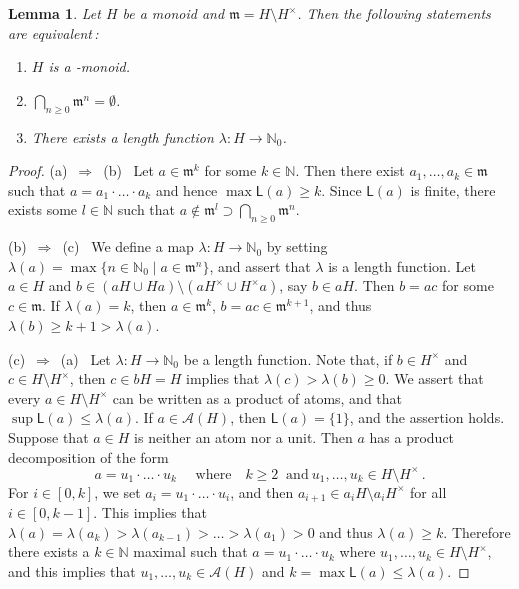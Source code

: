 \documentclass[a4paper]{amsart}
\newtheorem{lemma}[theorem]{Lemma}
\theoremstyle{definition}
\numberwithin{equation}{section}
\begin{document}
\medskip
\begin{lemma} \label{6.1}
Let $H$ be a monoid and $\mathfrak m = H \setminus H^{\times}$. Then
the following statements are equivalent{\rm \,:}
\begin{enumerate}
\item[(a)] $H$ is a {}-monoid.

\smallskip
\item[(b)] $\bigcap_{n \ge 0} \mathfrak m^n = \emptyset$.

\smallskip
\item[(c)] There exists a length function $\lambda \colon H \to \mathbb
           N_0$.
\end{enumerate}
\end{lemma}

\begin{proof}
(a) \,$\Rightarrow$\, (b) \ Let $a \in \mathfrak m^k$ for some $k
\in \mathbb N$. Then there exist $a_1, \ldots, a_k \in \mathfrak m$
such that $a = a_1 \cdot \ldots \cdot a_k$ and hence $\max \mathsf L
(a) \ge k$. Since $\mathsf L (a)$ is finite, there exists some $l
\in \mathbb N$ such that $a \notin \mathfrak m^l \supset \bigcap_{n
\ge 0} \mathfrak m^n$.

\smallskip
(b) \,$\Rightarrow$\, (c) \ We define  a map $\lambda \colon H \to
\mathbb N_0$ by setting $\lambda (a) = \max \{ n \in \mathbb N_0
\mid a \in \mathfrak m^n \}$, and assert that $\lambda$ is a length
function. Let $a \in H$ and $b \in (aH \cup Ha) \setminus
(aH^{\times} \cup H^{\times}a)$, say $b \in aH$. Then $b = ac$ for
some $c \in \mathfrak m$. If $\lambda (a) = k$, then $a \in
\mathfrak m^k$, $b = ac \in \mathfrak m^{k+1}$, and thus $\lambda
(b) \ge k+1 > \lambda (a)$.

(c) \,$\Rightarrow$\, (a) \ Let $\lambda \colon H \to \mathbb N_0$
be a length function. Note that, if $b \in H^{\times}$ and $c \in H
\setminus H^{\times}$, then $c \in bH = H$ implies that $\lambda (c)
> \lambda (b) \ge 0$. We assert that every $a \in H \setminus
H^{\times}$ can be written as a product of atoms, and that $\sup
\mathsf L (a) \le \lambda (a)$. If $a \in \mathcal A (H)$, then
$\mathsf L (a) = \{1\}$, and the assertion holds. Suppose that $a
\in H$ is neither an atom nor a unit. Then $a$ has a product
decomposition of the form
\[
a = u_1 \cdot \ldots \cdot u_k \quad \text{ where} \quad  k \ge 2 \
\text{ and}  \ u_1, \ldots, u_k \in H \setminus H^{\times} \,.
\tag{$*$}
\]
For $i \in [0, k]$, we set $a_i = u_1 \cdot \ldots \cdot u_i$, and
then $a_{i+1} \in a_iH \setminus a_iH^{\times}$ for all $i \in [0,
k-1]$. This implies that $\lambda (a) = \lambda (a_k) > \lambda
(a_{k-1}) > \ldots > \lambda (a_1) > 0$ and thus $\lambda (a) \ge
k$. Therefore there exists a $k \in {\mathbb N}$ maximal such that $a = u_1
\cdot \ldots \cdot u_k$ where $u_1, \ldots, u_k \in H \setminus
H^{\times}$, and this implies that $u_1, \ldots, u_k \in \mathcal A
(H)$ and $k = \max \mathsf L (a) \le \lambda (a)$.
\end{proof}
\end{document}
